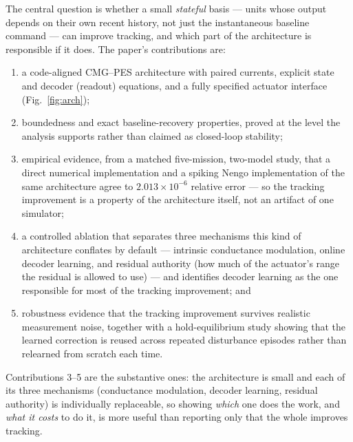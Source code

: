 \documentclass[letterpaper, 10 pt, conference]{ieeeconf}
\begin{document}
The central question is whether a small \emph{stateful} basis --- units whose
output depends on their own recent history, not just the instantaneous
baseline command --- can improve tracking, and which part of the
architecture is responsible if it does. The paper's contributions are:
\begin{enumerate}
    \item a code-aligned CMG--PES architecture with paired currents,
explicit state and decoder (readout) equations, and a fully specified
actuator interface (Fig.~\ref{fig:arch});
\item boundedness and exact
baseline-recovery properties, proved at the level the analysis supports
rather than claimed as closed-loop stability;
\item empirical evidence, from a matched five-mission, two-model study, that
a direct numerical implementation and a spiking Nengo implementation of the
same architecture agree to $2.013\times10^{-6}$ relative error --- so the
tracking improvement is a property of the architecture itself, not an
artifact of one simulator;
\item a controlled ablation that
separates three mechanisms this kind of architecture conflates by default
--- intrinsic conductance modulation, online decoder learning, and residual
authority (how much of the actuator's range the residual is allowed to use)
--- and identifies decoder learning as the one responsible for most of the
tracking improvement; and
\item robustness
evidence that the tracking improvement survives realistic measurement noise,
together with a hold-equilibrium study showing that the learned correction is
reused across repeated disturbance episodes rather than relearned from
scratch each time.
\end{enumerate}

Contributions 3--5
are the substantive ones: the architecture is small and each of its three
mechanisms (conductance modulation, decoder learning, residual authority) is
individually replaceable, so showing \emph{which} one does the work, and
\emph{what it costs} to do it, is more useful than reporting only that the
whole improves tracking.
\end{document}
